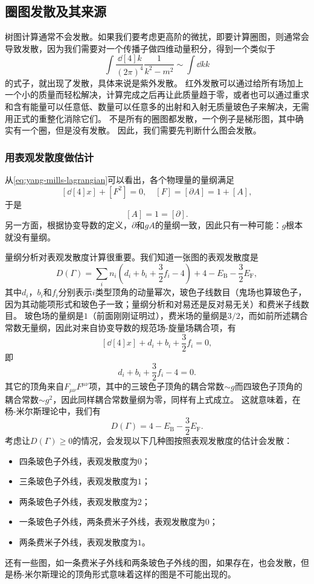 \documentclass[hyperref, UTF8, a4paper]{ctexart}
\begin{document}
\subsection{圈图发散及其来源}

树图计算通常不会发散。如果我们要考虑更高阶的微扰，即要计算圈图，则通常会导致发散，因为我们需要对一个传播子做四维动量积分，得到一个类似于
\[
    \int \frac{\dd[4]{k}}{(2\pi)^4} \frac{1}{k^2 - m^2} \sim \int \dd{k} k
\]
的式子，就出现了发散，具体来说是紫外发散。
红外发散可以通过给所有场加上一个小的质量而轻松解决，计算完成之后再让此质量趋于零，或者也可以通过重求和含有能量可以任意低、数量可以任意多的出射和入射无质量玻色子来解决，无需用正式的重整化消除它们。
不是所有的圈图都发散，一个例子是梯形图，其中确实有一个圈，但是没有发散。
因此，我们需要先判断什么图会发散。

\subsubsection{用表观发散度做估计}

从\eqref{eq:yang-mills-lagrangian}可以看出，各个物理量的量纲满足
\[
    [\dd[4]{x}] + [F^2] = 0, \quad [F] = [\partial A] = 1 + [A],
\]
于是
\[
    [A] = 1 = [\partial].
\]
另一方面，根据协变导数的定义，$\partial$和$g A$的量纲一致，因此只有一种可能：$g$根本就没有量纲。

量纲分析对表观发散度计算很重要。我们知道一张图的表观发散度是
\begin{equation}
    D(\Gamma) = \sum_i n_i \left( d_i + b_i + \frac{3}{2} f_i - 4  \right) + 4 - E_\text{B} - \frac{3}{2} E_\text{F},
\end{equation}
其中$d_i$，$b_i$和$f_i$分别表示$i$类型顶角的动量幂次，玻色子线数目（鬼场也算玻色子，因为其动能项形式和玻色子一致；量纲分析和对易还是反对易无关）和费米子线数目。
玻色场的量纲是$1$（前面刚刚证明过），费米场的量纲是$3/2$，而如前所述耦合常数无量纲，因此对来自协变导数的规范场-旋量场耦合项，有
\[
    [\dd[4]{x}] + d_i + b_i + \frac{3}{2} f_i = 0,
\]
即
\[
    d_i + b_i + \frac{3}{2} f_i - 4 = 0.
\]
其它的顶角来自$F_{\mu \nu} F^{\mu \nu}$项，其中的三玻色子顶角的耦合常数$\sim g$而四玻色子顶角的耦合常数$\sim g^2$，因此同样耦合常数量纲为零，同样有上式成立。
这就意味着，在杨-米尔斯理论中，我们有
\begin{equation}
    D(\Gamma) = 4 - E_\text{B} - \frac{3}{2} E_\text{F}.
\end{equation}
考虑让$D(\Gamma) \geq 0$的情况，会发现以下几种图按照表观发散度的估计会发散：
\begin{itemize}
    \item 四条玻色子外线，表观发散度为$0$；
    \item 三条玻色子外线，表观发散度为$1$；
    \item 两条玻色子外线，表观发散度为$2$；
    \item 一条玻色子外线，两条费米子外线，表观发散度为$0$；
    \item 两条费米子外线，表观发散度为$1$。
\end{itemize}
还有一些图，如一条费米子外线和两条玻色子外线的图，如果存在，也会发散，但是杨-米尔斯理论的顶角形式意味着这样的图是不可能出现的。
\end{document}
